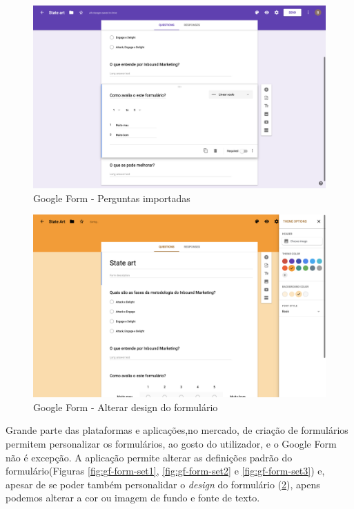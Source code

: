 \begin{figure}[h!]
	\begin{center}
		\includegraphics[width=1\textwidth]{img/gf/gf-form-imported}
		\caption{Google Form - Perguntas importadas}
		\label{fig:gf-form-imported}
	\end{center}
\end{figure}


\begin{figure}[h!]
	\begin{center}
		\includegraphics[width=1\textwidth]{img/gf/gf-form-design}
		\caption{Google Form - Alterar design do formulário}
		\label{fig:gf-form-design}
	\end{center}
\end{figure}

\newpage

Grande parte das plataformas e aplicações,no mercado, de criação de formulários permitem personalizar os formulários, ao gosto do utilizador, e o Google Form não é excepção. A aplicação permite alterar as definições padrão do formulário(Figuras \ref{fig:gf-form-set1}, \ref{fig:gf-form-set2} e \ref{fig:gf-form-set3}) e, apesar de se poder também personalidar o \textit{design} do formulário (\ref{fig:gf-form-design}), apens podemos alterar a cor ou imagem de fundo e fonte de texto.

